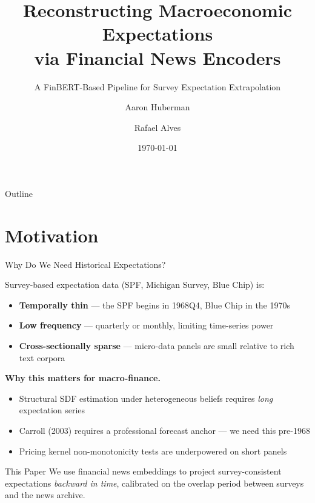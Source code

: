 \documentclass[aspectratio=169, 11pt]{beamer}
\title[News Encoders \& Macro Expectations]{Reconstructing Macroeconomic Expectations\\via Financial News Encoders}
\subtitle{A FinBERT-Based Pipeline for Survey Expectation Extrapolation}
\author{Aaron Huberman \and Rafael Alves}
\institute{Duke University}
\date{\today}
\begin{document}
\begin{frame}
  \titlepage
\end{frame}

\begin{frame}{Outline}
  \tableofcontents
\end{frame}

\section{Motivation}

\begin{frame}{Why Do We Need Historical Expectations?}

Survey-based expectation data (SPF, Michigan Survey, Blue Chip) is:
\begin{itemize}\itemsep2pt
  \item \textbf{Temporally thin} --- the SPF begins in 1968Q4, Blue Chip in the 1970s
  \item \textbf{Low frequency} --- quarterly or monthly, limiting time-series power
  \item \textbf{Cross-sectionally sparse} --- micro-data panels are small relative to rich text corpora
\end{itemize}

\vspace{0.3cm}
\textbf{Why this matters for macro-finance.}
\begin{itemize}\itemsep2pt
  \item Structural SDF estimation under heterogeneous beliefs requires \emph{long} expectation series
  \item Carroll (2003) requires a professional forecast anchor --- we need this pre-1968
  \item Pricing kernel non-monotonicity tests are underpowered on short panels
\end{itemize}

\vspace{0.3cm}
\begin{block}{This Paper}
We use financial news embeddings to project survey-consistent expectations \emph{backward in time}, calibrated on the overlap period between surveys and the news archive.
\end{block}

\end{frame}
\end{document}
